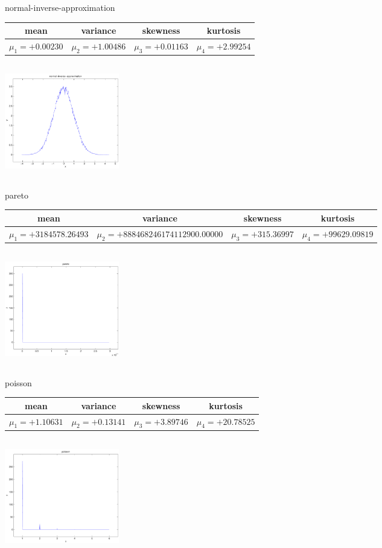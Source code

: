 \documentclass[9pt]{article}
\theoremstyle{plain}
\theoremstyle{definition}
\theoremstyle{remark}
\numberwithin{equation}{section}
\begin{document}
\newpage
normal-inverse-approximation \begin{tabular}{|c|c|c|c|}  mean & variance & skewness & kurtosis \\  \hline
$\mu_1 = +0.00230$ & $\mu_2 = +1.00486$ & $\mu_3 = +0.01163$ & $\mu_4 =+2.99254$ \\
\end{tabular}

\includegraphics[width=5cm,height=5cm]{normal-inverse-approximation.pdf}

pareto \begin{tabular}{|c|c|c|c|}  mean & variance & skewness & kurtosis \\  \hline
$\mu_1 = +3184578.26493$ & $\mu_2 = +888468246174112900.00000$ & $\mu_3 = +315.36997$ & $\mu_4 =+99629.09819$ \\
\end{tabular}

\includegraphics[width=5cm,height=5cm]{pareto.pdf}

poisson \begin{tabular}{|c|c|c|c|}  mean & variance & skewness & kurtosis \\  \hline
$\mu_1 = +1.10631$ & $\mu_2 = +0.13141$ & $\mu_3 = +3.89746$ & $\mu_4 =+20.78525$ \\
\end{tabular}

\includegraphics[width=5cm,height=5cm]{poisson.pdf}
\end{document}
